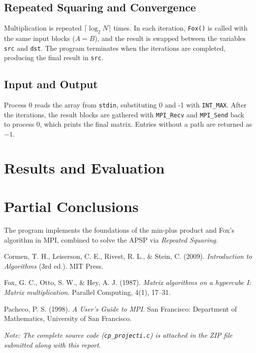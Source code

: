 \documentclass[10pt,a4paper]{article}
\begin{document}
\subsection{Repeated Squaring and Convergence}
Multiplication is repeated \(\lceil \log_{2} N \rceil\) times. In each iteration, \texttt{Fox()} is called with the same input blocks (\(A=B\)), and the result is swapped between the variables \texttt{src} and \texttt{dst}. The program terminates when the iterations are completed, producing the final result in \texttt{src}.

\subsection{Input and Output}
Process 0 reads the array from \texttt{stdin}, substituting 0 and -1 with \texttt{INT\_MAX}. After the iterations, the result blocks are gathered with \texttt{MPI\_Recv} and \texttt{MPI\_Send} back to process 0, which prints the final matrix. Entries without a path are returned as \(-1\).

\section{Results and Evaluation}



\section{Partial Conclusions}
The program implements the foundations of the min-plus product and Fox's algorithm in MPI, combined to solve the APSP via \emph{Repeated Squaring}.

\begin{thebibliography}{9}
Cormen, T. H., Leiserson, C. E., Rivest, R. L., \& Stein, C. (2009).
\textit{Introduction to Algorithms} (3rd ed.).
MIT Press.

Fox, G. C., Otto, S. W., \& Hey, A. J. (1987).
\textit{Matrix algorithms on a hypercube I: Matrix multiplication}.
Parallel Computing, 4(1), 17–31.

Pacheco, P. S. (1998).
\textit{A User's Guide to MPI}.
San Francisco: Department of Mathematics, University of San Francisco.

\end{thebibliography}


\vspace{0.3cm}
\textit{Note: The complete source code (\texttt{cp\_projecti.c}) is attached in the ZIP file submitted along with this report.}
\end{document}
